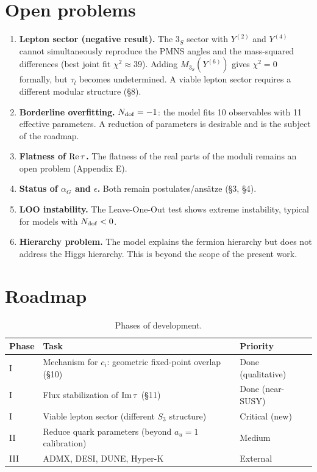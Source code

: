 \documentclass[12pt,a4paper]{article}
\numberwithin{equation}{section}
\begin{document}
\section{Open problems}
\begin{enumerate}[leftmargin=1.5em]
\item \textbf{Lepton sector (negative result).} The \(3_S\) sector with \(Y^{(2)}\) and \(Y^{(4)}\) cannot simultaneously reproduce the PMNS angles and the mass-squared differences (best joint fit \(\chi^2 \approx 39\)). Adding \(M_{3_S}(Y^{(6)})\) gives \(\chi^2 = 0\) formally, but \(\tau_l\) becomes undetermined. A viable lepton sector requires a different modular structure (\S8).
\item \textbf{Borderline overfitting.} \(N_{\rm dof} = -1\): the model fits 10 observables with 11 effective parameters. A reduction of parameters is desirable and is the subject of the roadmap.
\item \textbf{Flatness of \({\rm Re}\,\tau\).} The flatness of the real parts of the moduli remains an open problem (Appendix E).
\item \textbf{Status of \(\alpha_G\) and \(\epsilon\).} Both remain postulates/ansätze (\S3, \S4).
\item \textbf{LOO instability.} The Leave-One-Out test shows extreme instability, typical for models with \(N_{\rm dof} < 0\).
\item \textbf{Hierarchy problem.} The model explains the fermion hierarchy but does not address the Higgs hierarchy. This is beyond the scope of the present work.
\end{enumerate}

\section{Roadmap}
\begin{table}[H]
\centering
\caption{Phases of development.}
\begin{tabular}{lll}
\toprule
Phase & Task & Priority \\
\midrule
I & Mechanism for \(c_i\): geometric fixed-point overlap (\S10) & Done (qualitative) \\
I & Flux stabilization of \({\rm Im}\,\tau\) (\S11) & Done (near-SUSY) \\
I & Viable lepton sector (different \(S_3\) structure) & Critical (new) \\
II & Reduce quark parameters (beyond \(a_u=1\) calibration) & Medium \\
III & ADMX, DESI, DUNE, Hyper-K & External \\
\bottomrule
\end{tabular}
\end{table}
\end{document}
